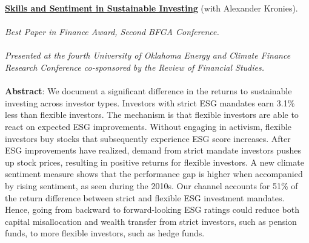 \documentclass[11pt]{res} %
\begin{document}
\begin{resume}
\begin{etaremune}
\item \href{https://andreasbrogger.com/SkillsAndSentimentInSustainableInvesting.pdf}{\bf Skills and Sentiment in Sustainable Investing} (with Alexander Kronies).\\ 
\\[-0.9em]
\textit{Best Paper in Finance Award, Second BFGA Conference.}\\
\\[-0.9em]
\textit{Presented at the fourth University of Oklahoma Energy and Climate Finance Research Conference co-sponsored by the Review of Financial Studies.} \\ %
\\[-0.9em]
\textbf{Abstract}: We document a significant difference in the returns to sustainable investing across
investor types. Investors with strict ESG mandates earn 3.1\% less than flexible
investors. The mechanism is that flexible investors are able to react on expected
ESG improvements. Without engaging in activism, flexible investors buy stocks
that subsequently experience ESG score increases. After ESG improvements have
realized, demand from strict mandate investors pushes up stock prices, resulting
in positive returns for flexible investors. A new climate sentiment measure shows
that the performance gap is higher when accompanied by rising sentiment, as seen
during the 2010s. Our channel accounts for 51\% of the return difference between
strict and flexible ESG investment mandates. Hence, going from backward to
forward-looking ESG ratings could reduce both capital misallocation and wealth
transfer from strict investors, such as pension funds, to more flexible investors,
such as hedge funds.\\
\\[-0.9em]



\end{etaremune}
\end{resume}
\end{document}

